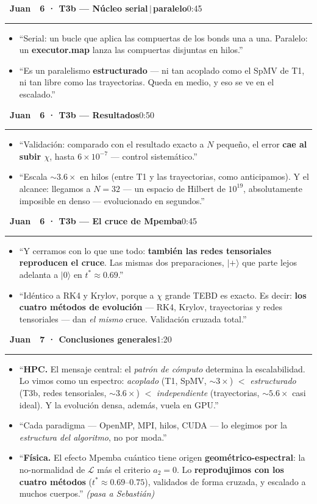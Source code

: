 \documentclass[11pt,a4paper]{article}
\newcommand{\Jb}{\colorbox{juan}{\color{white}\bfseries\footnotesize~Juan~}}
\newcommand{\cs}[1]{\textcolor{seb}{\textbf{#1}}}
\newcommand{\blk}[3]{%
  \par\medskip\noindent #1\ \textbf{#2}\hfill\textcolor{soft}{\small #3}\par
  \vspace{-4pt}\textcolor{soft!40}{\rule{\linewidth}{0.4pt}}\par\vspace{-2pt}}
\begin{document}
\blk{\Jb}{6 · T3b --- Núcleo serial\,$\vert$\,paralelo}{0:45}
\begin{itemize}
  \item ``Serial: un bucle que aplica las compuertas de los bonds una a una. Paralelo:
    un \cs{executor.map} lanza las compuertas disjuntas en hilos.''
  \item ``Es un paralelismo \textbf{estructurado} --- ni tan acoplado como el SpMV de
    T1, ni tan libre como las trayectorias. Queda en medio, y eso se ve en el escalado.''
\end{itemize}

\blk{\Jb}{6 · T3b --- Resultados}{0:50}
\begin{itemize}
  \item ``Validación: comparado con el resultado exacto a $N$ pequeño, el error
    \textbf{cae al subir $\chi$}, hasta $6\times10^{-7}$ --- control sistemático.''
  \item ``Escala $\sim3.6\times$ en hilos (entre T1 y las trayectorias, como
    anticipamos). Y el alcance: llegamos a \textbf{$N=32$} --- un espacio de Hilbert de
    $10^{19}$, absolutamente imposible en denso --- evolucionado en segundos.''
\end{itemize}

\blk{\Jb}{6 · T3b --- El cruce de Mpemba}{0:45}
\begin{itemize}
  \item ``Y cerramos con lo que une todo: \textbf{también las redes tensoriales
    reproducen el cruce}. Las mismas dos preparaciones, $|+\rangle$ que parte lejos
    adelanta a $|0\rangle$ en \cs{$t^*\approx0.69$}.''
  \item ``Idéntico a RK4 y Krylov, porque a $\chi$ grande TEBD es exacto. Es decir:
    \textbf{los cuatro métodos de evolución} --- RK4, Krylov, trayectorias y redes
    tensoriales --- dan \emph{el mismo} cruce. Validación cruzada total.''
\end{itemize}

\blk{\Jb}{7 · Conclusiones generales}{1:20}
\begin{itemize}
  \item ``\textbf{HPC.} El mensaje central: el \emph{patrón de cómputo} determina la
    escalabilidad. Lo vimos como un espectro:
    \emph{acoplado} (T1, SpMV, $\sim3\times$) $<$ \emph{estructurado} (T3b, redes
    tensoriales, $\sim3.6\times$) $<$ \emph{independiente} (trayectorias, $\sim5.6\times$
    casi ideal). Y la evolución densa, además, vuela en GPU.''
  \item ``Cada paradigma --- OpenMP, MPI, hilos, CUDA --- lo elegimos por la
    \emph{estructura del algoritmo}, no por moda.''
  \item ``\textbf{Física.} El efecto Mpemba cuántico tiene origen
    \textbf{geométrico-espectral}: la no-normalidad de $\mathcal{L}$ más el criterio
    $a_2=0$. Lo \textbf{reprodujimos con los cuatro métodos} ($t^*\approx0.69$--$0.75$),
    validados de forma cruzada, y escalado a muchos cuerpos.'' \emph{(pasa a Sebastián)}
\end{itemize}
\end{document}
